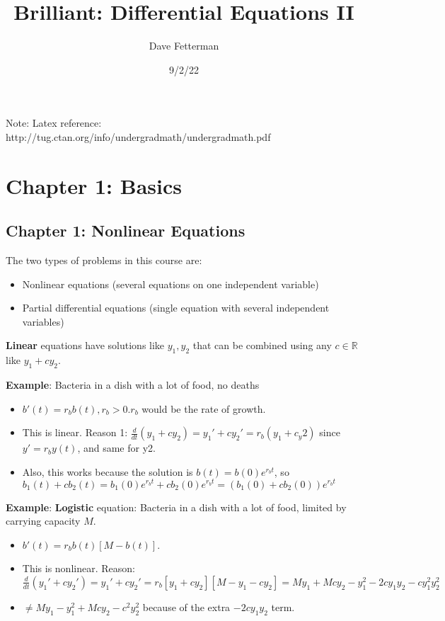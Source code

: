 \documentclass[11pt, oneside]{article}   	%
\title{Brilliant: Differential Equations II}
\author{Dave Fetterman}
\date{9/2/22}							%
\begin{document}
\maketitle
Note: Latex reference: http://tug.ctan.org/info/undergradmath/undergradmath.pdf

\section{Chapter 1: Basics}
\subsection{Chapter 1: Nonlinear Equations}



The two types of problems in this course are: 


\begin{itemize}
\item Nonlinear equations (several equations on one independent variable)
\item Partial differential equations (single equation with several independent variables)
\end{itemize}

\textbf{Linear} equations have solutions like $y_1,y_2$ that can be combined using any $c \in \mathbb{R}$ like $y_1 + cy_2$.

\textbf{Example}: Bacteria in a dish with a lot of food, no deaths
\begin{itemize}
\item $b'(t) = r_bb(t), r_b > 0. r_b$ would be the rate of growth.
\item This is linear. Reason 1: $\frac{d}{dt}(y_1 +cy_2) = y_1' +cy_2' = r_b(y_1 +c_y2)$ since $y' = r_by(t)$, and same for y2.
\item Also, this works because the solution is $b(t) = b(0)e^{r_b t}$, so $b_1(t) + cb_2(t) = b_1(0)e^{r_b t} +cb_2(0)e^{r_b t} = (b_1(0) + cb_2(0))e^{r_bt}$
\end{itemize}

\textbf{Example}: \textbf{Logistic} equation: Bacteria in a dish with a lot of food, limited by carrying capacity $M$.
\begin{itemize}
\item $b'(t) = r_bb(t)[M-b(t)]$.
\item This is nonlinear. Reason: $\frac{d}{dt}(y_1' +cy_2') = y_1'+cy_2' = r_b[y_1 + cy_2][M-y_1-cy_2] = My_1+Mcy_2-y_1^2-2cy_1y_2 -cy_1^2y_2^2$
\item $\neq My_1 - y_1^2 + Mcy_2-c^2y_2^2$ because of the extra $-2cy_1y_2$ term.
\end{itemize}
\end{document}
